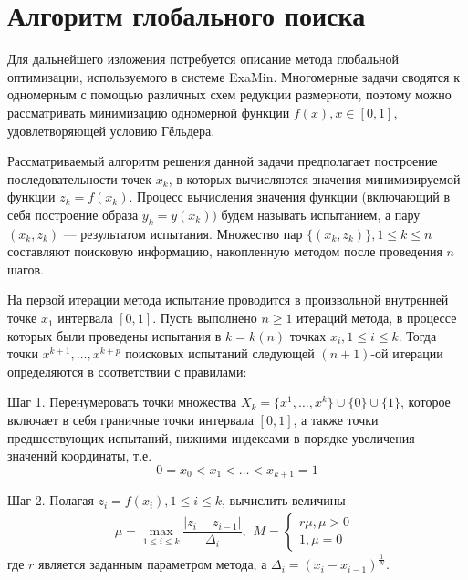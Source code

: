 \section{Алгоритм глобального поиска}
 Для дальнейшего изложения потребуется описание метода глобальной оптимизации, используемого в системе ExaMin. Многомерные задачи сводятся к одномерным с помощью различных схем редукции размерноти,
 поэтому можно рассматривать минимизацию одномерной функции  \(f(x), x\in[0,1]\), удовлетворяющей условию Гёльдера.
\par
Рассматриваемый алгоритм решения данной задачи предполагает построение последовательности точек \(x_k\), в которых вычисляются значения минимизируемой функции \(z_k = f(x_k)\).
Процесс вычисления значения функции (включающий в себя построение образа \(y_k=y(x_k))\) будем называть испытанием, а пару \((x_k,z_k)\) --- результатом испытания.
Множество пар \(\{(x_k,z_k)\}, 1\leqslant k\leqslant n\) составляют поисковую информацию, накопленную методом после проведения \(n\) шагов.
\par
На первой итерации метода испытание проводится в произвольной внутренней точке \(x_1\) интервала \([0,1]\). Пусть выполнено \(n\geqslant 1\) итераций метода,
в процессе которых были проведены испытания в \(k = k(n)\) точках \(x_i, 1\leqslant i\leqslant k\). Тогда точки \(x^{k+1},\dotsc,x^{k+p}\) поисковых испытаний следующей \((n+1)\)-ой
итерации определяются в соответствии с правилами:
\par
Шаг 1. Перенумеровать точки множества \(X_k=\{x^1,\dotsc,x^k\}\cup\{0\}\cup\{1\}\), которое включает в себя граничные точки интервала \([0,1]\), а также точки предшествующих испытаний, нижними индексами в порядке увеличения значений координаты, т.е.
\begin{displaymath}
0=x_0<x_1<\dotsc<x_{k+1}=1
\end{displaymath}
\par
Шаг 2. Полагая \(z_i=f(x_i),1\leqslant i\leqslant k\), вычислить величины
\begin{equation}
\label{step2}
\mu=\max_{1\leqslant i\leqslant k}\dfrac{|z_i-z_{i-1}|}{\Delta_i},
\begin{matrix}
    M =
    \left\{
    \begin{matrix}
    r\mu,\mu>0 \\
    1,\mu=0
    \end{matrix} \right.
    \end{matrix}
\end{equation}
где \(r\) является заданным параметром метода, а \(\Delta_i=(x_i-x_{i-1})^\frac{1}{N}\).
